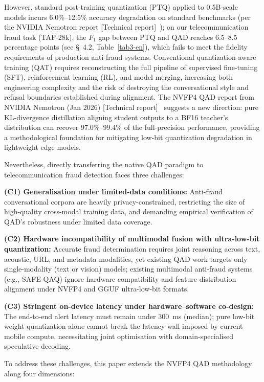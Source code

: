 \documentclass[11pt, a4paper]{article}
\begin{document}
However, standard post-training quantization (PTQ) applied to 0.5B-scale models incurs 6.0\%--12.5\% accuracy degradation on standard benchmarks (per the NVIDIA Nemotron report [Technical report]~\cite{3}); on our telecommunication fraud task (TAF-28k), the $F_1$ gap between PTQ and QAD reaches 6.5--8.5 percentage points (see \S~4.2, Table~\ref{tab3-en}), which fails to meet the fidelity requirements of production anti-fraud systems. Conventional quantization-aware training (QAT) requires reconstructing the full pipeline of supervised fine-tuning (SFT), reinforcement learning (RL), and model merging, increasing both engineering complexity and the risk of destroying the conversational style and refusal boundaries established during alignment. The NVFP4 QAD report from NVIDIA Nemotron (Jan 2026) [Technical report]~\cite{3} suggests a new direction: pure KL-divergence distillation aligning student outputs to a BF16 teacher's distribution can recover 97.0\%--99.4\% of the full-precision performance, providing a methodological foundation for mitigating low-bit quantization degradation in lightweight edge models.

Nevertheless, directly transferring the native QAD paradigm to telecommunication fraud detection faces three challenges:

\textbf{(C1) Generalisation under limited-data conditions:} Anti-fraud conversational corpora are heavily privacy-constrained, restricting the size of high-quality cross-modal training data, and demanding empirical verification of QAD's robustness under limited data coverage.

\textbf{(C2) Hardware incompatibility of multimodal fusion with ultra-low-bit quantization:} Accurate fraud determination requires joint reasoning across text, acoustic, URL, and metadata modalities, yet existing QAD work targets only single-modality (text or vision) models; existing multimodal anti-fraud systems (e.g., SAFE-QAQ) ignore hardware compatibility and feature distribution alignment under NVFP4 and GGUF ultra-low-bit formats.

\textbf{(C3) Stringent on-device latency under hardware--software co-design:} The end-to-end alert latency must remain under 300~ms (median); pure low-bit weight quantization alone cannot break the latency wall imposed by current mobile compute, necessitating joint optimisation with domain-specialised speculative decoding.

To address these challenges, this paper extends the NVFP4 QAD methodology along four dimensions:
\end{document}
